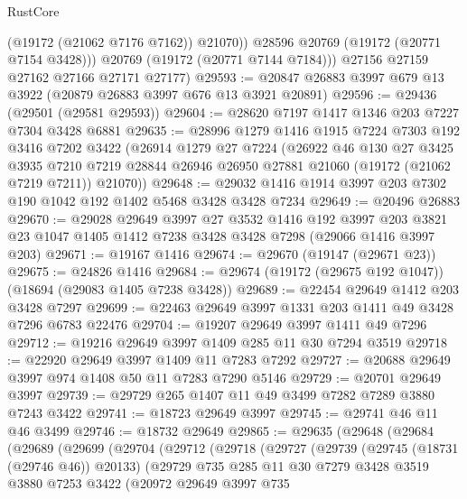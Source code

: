 \begin{lexlean}{RustCore}
\begin{coremodule}
              (@19172 (@21062 @7176 @7162))
              @21070))
          @28596
          @20769
          (@19172 (@20771 @7154 @3428)))
        @20769
        (@19172 (@20771 @7144 @7184)))
      @27156
      @27159
      @27162
      @27166
      @27171
      @27177)
@29593 := @20847 @26883 @3997 @679 @13 @3922 (@20879 @26883 @3997 @676 @13 @3921 @20891)
@29596 := @29436 (@29501 (@29581 @29593))
@29604 := @28620 @7197 @1417 @1346 @203 @7227 @7304 @3428 @6881
@29635 := @28996
    @1279
    @1416
    @1915
    @7224
    @7303
    @192
    @3416
    @7202
    @3422
    (@26914
      @1279
      @27
      @7224
      (@26922
        @46
        @130
        @27
        @3425
        @3935
        @7210
        @7219
        @28844
        @26946
        @26950
        @27881
        @21060
        (@19172 (@21062 @7219 @7211))
        @21070))
@29648 := @29032 @1416 @1914 @3997 @203 @7302 @190 @1042 @192 @1402 @5468 @3428 @3428 @7234
@29649 := @20496 @26883
@29670 := @29028
    @29649
    @3997
    @27
    @3532
    @1416
    @192
    @3997
    @203
    @3821
    @23
    @1047
    @1405
    @1412
    @7238
    @3428
    @3428
    @7298
    (@29066 @1416 @3997 @203)
@29671 := @19167 @1416
@29674 := @29670 (@19147 (@29671 @23))
@29675 := @24826 @1416
@29684 := @29674 (@19172 (@29675 @192 @1047)) (@18694 (@29083 @1405 @7238 @3428))
@29689 := @22454 @29649 @1412 @203 @3428 @7297
@29699 := @22463 @29649 @3997 @1331 @203 @1411 @49 @3428 @7296 @6783 @22476
@29704 := @19207 @29649 @3997 @1411 @49 @7296
@29712 := @19216 @29649 @3997 @1409 @285 @11 @30 @7294 @3519
@29718 := @22920 @29649 @3997 @1409 @11 @7283 @7292
@29727 := @20688 @29649 @3997 @974 @1408 @50 @11 @7283 @7290 @5146
@29729 := @20701 @29649 @3997
@29739 := @29729 @265 @1407 @11 @49 @3499 @7282 @7289 @3880 @7243 @3422
@29741 := @18723 @29649 @3997
@29745 := @29741 @46 @11 @46 @3499
@29746 := @18732 @29649
@29865 := @29635
    (@29648
      (@29684
        (@29689
          (@29699
            (@29704
              (@29712
                (@29718
                  (@29727
                    (@29739
                      (@29745 (@18731 (@29746 @46)) @20133)
                      (@29729
                        @735
                        @285
                        @11
                        @30
                        @7279
                        @3428
                        @3519
                        @3880
                        @7253
                        @3422
                        (@20972
                          @29649
                          @3997
                          @735

\end{coremodule}
\end{lexlean}
